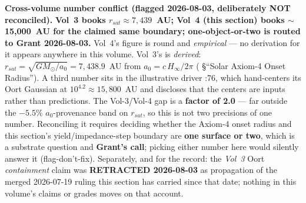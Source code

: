 \noindent\textbf{Cross-volume number conflict (flagged 2026-08-03, deliberately
NOT reconciled).}  \textbf{Vol~3 books $r_{sat} \approx 7{,}439$~AU; Vol~4 (this
section) books $\sim$15,000~AU for the claimed same boundary; one-object-or-two
is routed to Grant 2026-08-03.}  Vol~4's figure is round and \emph{empirical} ---
no derivation for it appears anywhere in this volume.  Vol~3's is \emph{derived}:
$r_{sat} = \sqrt{GM_\odot/a_0} = 7{,}438.9$~AU from $a_0 = c\,H_\infty/2\pi$
( \S``Solar Axiom-4
Onset Radius'').  A third number sits in the illustrative driver
:76,
which hand-centers its Oort Gaussian at $10^{4.2} \approx 15{,}800$~AU and
discloses that the centers are inputs rather than predictions.  The Vol-3/Vol-4
gap is a \textbf{factor of 2.0} --- far outside the $-5.5\%$ $a_0$-provenance
band on $r_{sat}$, so this is not two precisions of one number.  Reconciling it
requires deciding whether the Axiom-4 onset radius and this section's
yield/impedance-step boundary are \textbf{one surface or two}, which is a
substrate question and \textbf{Grant's call}; picking either number here would
silently answer it (flag-don't-fix).  Separately, and for the record: the
\emph{Vol~3} Oort \emph{containment} claim was \textbf{RETRACTED 2026-08-03} as
propagation of the merged 2026-07-19 ruling this section has carried since that
date; nothing in this volume's claims or grades moves on that account.

